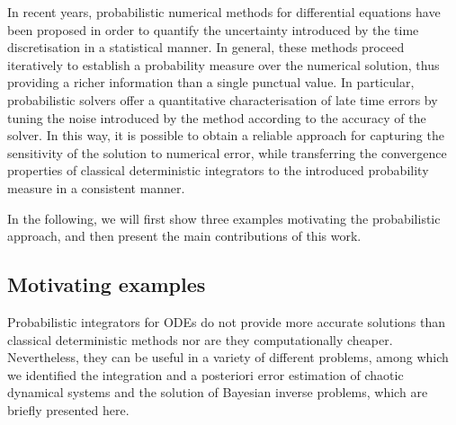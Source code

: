 \documentclass[10pt]{article}
\begin{document}
In recent years, probabilistic numerical methods for differential equations have been proposed \cite{CGS16, CCC16, SDH14} in order to quantify the uncertainty introduced by the time discretisation in a statistical manner. In general, these methods proceed iteratively to establish a probability measure over the numerical solution, thus providing a richer information than a single punctual value. In particular, probabilistic solvers offer a quantitative characterisation of late time errors by tuning the noise introduced by the method according to the accuracy of the solver. In this way, it is possible to obtain a reliable approach for capturing the sensitivity of the solution to numerical error, while transferring the convergence properties of classical deterministic integrators to the introduced probability measure in a consistent manner. 

In the following, we will first show three examples motivating the probabilistic approach, and then present the main contributions of this work.

\subsection{Motivating examples} Probabilistic integrators for ODEs do not provide more accurate solutions than classical deterministic methods nor are they computationally cheaper. Nevertheless, they can be useful in a variety of different problems, among which we identified the integration and a posteriori error estimation of chaotic dynamical systems and the solution of Bayesian inverse problems, which are briefly presented here.
\end{document}
